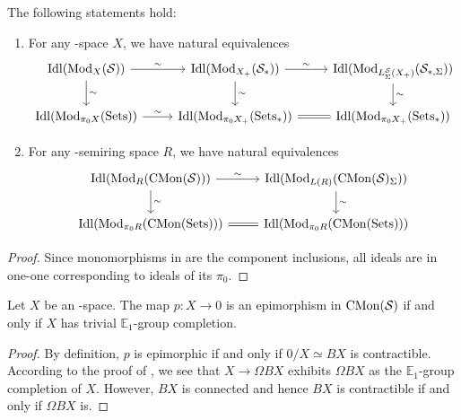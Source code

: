 \documentclass[10pt,a4paper,oneside]{article}
\begin{document}
\begin{prop}
The following statements hold:
\begin{enumerate}[label=(\arabic*),font=\normalfont]
\item For any \ein-space $X$, we have natural equivalences
$$
\begin{tikzcd}
\idl(\modu_{X}(\mcs)) \arrow[r, "\sim"] \arrow[d, "\sim"] & \idl(\modu_{X_+}(\mcs_*)) \arrow[d, "\sim"] \arrow[r, "\sim"]              & \idl(\modu_{L^{\mcs}_\Sigma(X_+)}(\mcs_{*,\Sigma})) \arrow[d, "\sim"] \\
\idl(\modu_{\pi_0X}(\op{Sets})) \arrow[r, "\sim"] & \idl(\modu_{\pi_0X_+}(\op{Sets}_*)) \arrow[r, Rightarrow, no head] & \idl(\modu_{\pi_0X_+}(\op{Sets}_*))                           
\end{tikzcd}
$$
\item For any \ein-semiring space $R$, we have natural equivalences
$$
\begin{tikzcd}
\idl(\modu_{R}(\cmon(\mcs))) \arrow[r, "\sim"] \arrow[d, "\sim"]              & \idl(\modu_{L(R)}(\cmon(\mcs)_\Sigma)) \arrow[d, "\sim"] \\
\idl(\modu_{\pi_0R}(\cmon(\op{Sets}))) \arrow[r,  Rightarrow, no head] & \idl(\modu_{\pi_0R}(\cmon(\op{Sets})))          
\end{tikzcd}
$$

\end{enumerate}

\end{prop}

\begin{proof}

Since monomorphisms in \mcs are the component inclusions, all ideals are in one-one corresponding to ideals of its $\pi_0$. %
\end{proof}

\begin{lem}
Let $X$ be an \ein-space. The map $p:X\to 0$ is an epimorphism in $\operatorname{CMon}(\mathcal{S})$ if and only if $X$ has trivial $\mathbb{E}_1$-group completion.
\end{lem}

\begin{proof}
By definition, $p$ is epimorphic if and only if $0/X\simeq BX$ is contractible. 	According to the proof of \cite[Theorem 1]{nikolaus2017group}, we see that  $X\to \Omega BX$ exhibits $\Omega BX$ as the $\mathbb{E}_1$-group completion of $X$. However, $BX$ is connected and hence $BX$ is contractible if and only if $\Omega BX$ is.
\end{proof}
\end{document}
